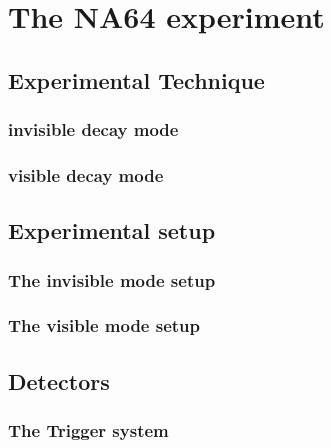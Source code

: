 
\chapter{The NA64 experiment} %

\label{chapter2} %


\section{Experimental Technique}
\label{chapter2:sec:experimental-technique}

\subsection{invisible decay mode}
\label{chapter2:sec:experimental-technique-invis}

\subsection{visible decay mode}
\label{chapter2:sec:experimental-technique-vis}

\section{Experimental setup}
\label{chapter2:sec:experimental-setup}

\subsection{The invisible mode setup}
\label{chapter2:sec:invismode}

\subsection{The visible mode setup}
\label{chapter2:sec:vismode}

\section{Detectors}
\label{chapter2:sec:detectors}

\subsection{The Trigger system}
\label{chapter2:sec:detectors-trigger}

